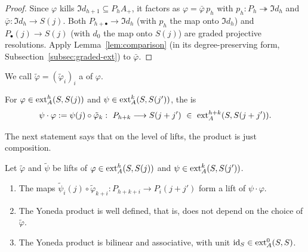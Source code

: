 \begin{proof}
Since $\varphi$ kills $\Im d_{h+1}\subseteq P_hA_+$, it factors as $\varphi=\bar\varphi\,p_h$ with $p_h:P_h\twoheadrightarrow\Im d_h$ and $\bar\varphi:\Im d_h\to S(j)$.
Both $P_{h+\bullet}\to\Im d_h$ (with $p_h$ the map onto $\Im d_h$) and $P_\bullet(j)\to S(j)$ (with $d_0$ the map onto $S(j)$) are graded projective resolutions.
Apply Lemma~\ref{lem:comparison} (in its degree-preserving form, Subsection~\ref{subsec:graded-ext}) to $\bar\varphi$.
\end{proof}

We call $\tilde\varphi=(\tilde\varphi_i)_i$ a  of $\varphi$.

\begin{definition}\label{def:yoneda-product}
For $\varphi\in\operatorname{ext}\nolimits_A^h(S,S(j))$ and $\psi\in\operatorname{ext}\nolimits_A^k(S,S(j'))$, the  is
\[
\psi\cdot\varphi:=\psi(j)\circ\tilde\varphi_k:\ P_{h+k}\longrightarrow S(j+j')\ \in\ \ext_A^{h+k}(S,S(j+j')).
\]
\end{definition}

The next statement says that on the level of lifts, the product is just composition.

\begin{proposition}\label{prop:yoneda-algebra}
Let $\tilde\varphi$ and $\tilde\psi$ be lifts of $\varphi\in\operatorname{ext}\nolimits_A^h(S,S(j))$ and $\psi\in\operatorname{ext}\nolimits_A^k(S,S(j'))$.
\begin{enumerate}
\item The maps $\tilde\psi_i(j)\circ\tilde\varphi_{k+i}:P_{h+k+i}\to P_i(j+j')$ form a lift of $\psi\cdot\varphi$.
\item The Yoneda product is well defined, that is, does not depend on the choice of $\tilde\varphi$.
\item The Yoneda product is bilinear and associative, with unit $\operatorname{id}_S\in\operatorname{ext}\nolimits_A^0(S,S)$.
\end{enumerate}
\end{proposition}

